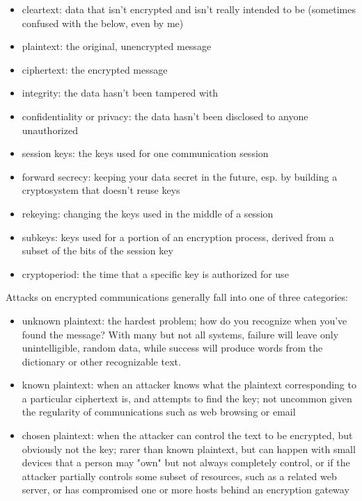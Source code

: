 \documentclass[%
 aip,
 jmp,%
 amsmath,amssymb,
 reprint,%
]{revtex4-1}
\begin{document}
\begin{itemize}
\item cleartext: data that isn't encrypted and isn't really intended to be
  (sometimes confused with the below, even by me)
\item plaintext: the original, unencrypted message
\item ciphertext: the encrypted message
\item integrity: the data hasn't been tampered with
\item confidentiality or privacy: the data hasn't been disclosed to anyone unauthorized
\item session keys: the keys used for one communication session
\item forward secrecy: keeping your data secret in the future, esp. by
  building a cryptosystem that doesn't reuse keys
\item rekeying: changing the keys used in the middle of a session
\item subkeys: keys used for a portion of an encryption process, derived
  from a subset of the bits of the session key
\item cryptoperiod: the time that a specific key is authorized for use
\end{itemize}

Attacks on encrypted communications generally fall into one of three
categories:

\begin{itemize}
\item unknown plaintext: the hardest problem; how do you recognize when
  you've found the message?  With many but not all systems, failure
  will leave only unintelligible, random data, while success will
  produce words from the dictionary or other recognizable text.
\item known plaintext: when an attacker knows what the plaintext
  corresponding to a particular ciphertext is, and attempts to find
  the key; not uncommon given the regularity of communications such as
  web browsing or email
\item chosen plaintext: when the attacker can control the text to be
  encrypted, but obviously not the key; rarer than known plaintext,
  but can happen with small devices that a person may "own" but not
  always completely control, or if the attacker partially controls
  some subset of resources, such as a related web server, or has
  compromised one or more hosts behind an encryption gateway
\end{itemize}
\end{document}
